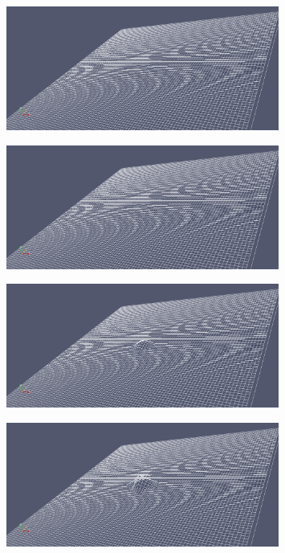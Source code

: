 
\begin{figure}[H]
    \centering
    \caption{}
    \label{pic:comsol-example-1}
    \includegraphics[width=0.8\textwidth]{img/comsol/example_1.png}
\end{figure}

\begin{figure}[H]
    \centering
    \caption{}
    \label{pic:comsol-example-1}
    \includegraphics[width=0.8\textwidth]{img/comsol/example_1.png}
\end{figure}

\begin{figure}[H]
    \centering
    \caption{}
    \label{pic:comsol-example-2}
    \includegraphics[width=0.8\textwidth]{img/comsol/example_2.png}
\end{figure}

\begin{figure}[H]
    \centering
    \caption{}
    \label{pic:comsol-example-3}
    \includegraphics[width=0.8\textwidth]{img/comsol/example_3.png}
\end{figure}

